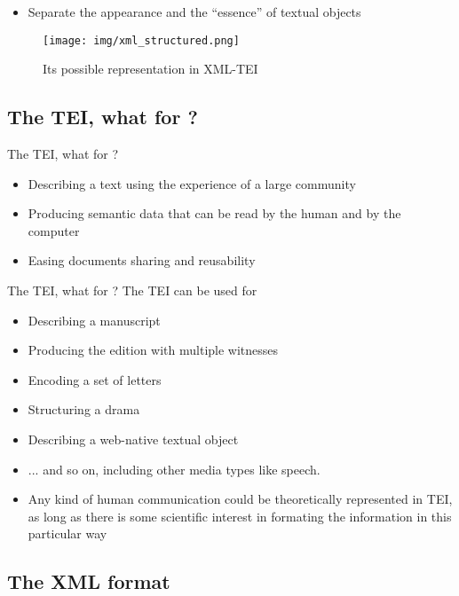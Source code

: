 \documentclass[11pt,aspectratio=1610]{beamer}
\begin{document}
\begin{frame}{}
\begin{itemize}
\item Separate the appearance and the \enquote{essence} of textual objects
\end{itemize}
\begin{center}
\begin{figure}
\texttt{[image: img/xml\_structured.png]}
\caption{Its possible representation in XML-TEI}
\end{figure}
\end{center}
\end{frame}


\subsection{The TEI, what for ?}
\begin{frame}{The TEI, what for ?}
\begin{itemize}
\item Describing a text using the experience of a large community
\item Producing semantic data that can be read by the human and by the computer
\item Easing documents sharing and reusability
\end{itemize}
\end{frame}


\begin{frame}{The TEI, what for ?}
The TEI can be used for
\begin{itemize}
\item Describing a manuscript
\item Producing the edition with multiple witnesses
\item Encoding a set of letters
\item Structuring a drama
\item Describing a web-native textual object
\item ... and so on, including other media types like speech. 
\item Any kind of human communication could be theoretically represented in TEI, as long as there is some scientific interest in formating the information in this particular way
\end{itemize}
\end{frame}


\subsection{The XML format}
\end{document}
